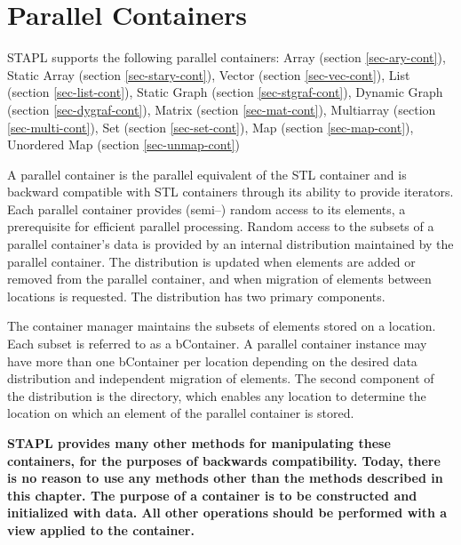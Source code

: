 \chapter{Parallel Containers}

STAPL supports the following parallel containers:
\vspace{0.4cm}
\newline
Array (section \ref{sec-ary-cont}),
Static Array (section \ref{sec-stary-cont}),
\newline
Vector (section \ref{sec-vec-cont}),
List (section \ref{sec-list-cont}),
\newline
Static Graph (section \ref{sec-stgraf-cont}),
Dynamic Graph (section \ref{sec-dygraf-cont}),
\newline
Matrix (section \ref{sec-mat-cont}),
Multiarray (section \ref{sec-multi-cont}),
\newline
Set (section \ref{sec-set-cont}),
Map (section \ref{sec-map-cont}),
Unordered Map (section \ref{sec-unmap-cont})
\vspace{0.4cm}

A parallel container is the parallel equivalent of the STL container and is backward compatible with STL containers through its ability to provide iterators. Each parallel container provides (semi–) random access to its elements, a prerequisite for efficient parallel processing. Random access to the subsets of a parallel container's data is provided by an internal distribution maintained by the parallel container. The distribution is updated when elements are added or removed from the parallel container, and when migration of elements between locations is requested. The distribution has two primary components. 

The container manager maintains the subsets of elements stored on a location. Each subset is referred to as a bContainer. A parallel container instance may have more than one bContainer per location depending on the desired data distribution and independent migration of elements. The second component of the distribution is the directory, which enables any location to determine the location on which an element of the parallel container is stored.

\vspace{0.4cm}
\textbf{
STAPL provides many other methods for manipulating these 
containers, for the purposes of backwards compatibility.  
Today, there is no reason to use any methods other than the methods 
described in this chapter.
The purpose of a container is to be constructed and initialized with data.
All other operations should be performed with a view applied to the container.
}

